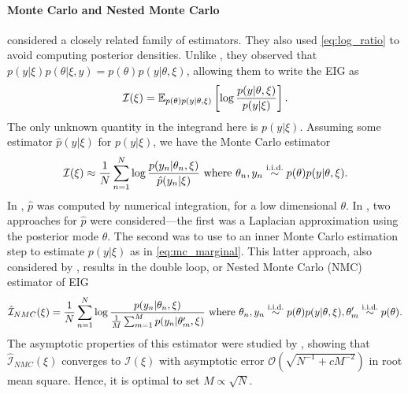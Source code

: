 \documentclass[a4paper, 10pt]{report}
\theoremstyle{plain}
\begin{document}
	\paragraph{Monte Carlo and Nested Monte Carlo} \citet{hamada2001finding,ryan2003estimating} considered a closely related family of estimators.
	They also used \eqref{eq:log_ratio} to avoid computing posterior densities.
	Unlike \citet{cook2008optimal,ryan2014towards}, they observed that $p(y|\xi)p(\theta|\xi,y) = p(\theta)p(y|\theta,\xi)$, allowing them to write the EIG as 
	\begin{equation}
	\mathcal{I}(\xi) = \mathbb{E}_{p(\theta)p(y|\theta,\xi)}\left[\log\frac{p(y|\theta,\xi)}{p(y|\xi)} \right].
	\end{equation}
	The only unknown quantity in the integrand here is $p(y|\xi)$. Assuming some estimator $\hat{p}(y|\xi)$ for $p(y|\xi)$, we have the Monte Carlo estimator
	\begin{equation}
	\mathcal{I}(\xi) \approx \frac{1}{N}\sum_{n=1}^N \log \frac{p(y_n|\theta_n,\xi)}{\hat{p}(y_n|\xi)} \text{ where } \theta_n,y_n \overset{\scriptstyle{\text{i.i.d.}}}{\sim} p(\theta)p(y|\theta,\xi).
	\end{equation}
	In \citet{hamada2001finding}, $\hat{p}$ was computed by numerical integration, for a low dimensional $\theta$.
	In \citet{ryan2003estimating}, two approaches for $\hat{p}$ were considered---the first was a Laplacian approximation using the posterior mode $\hat{\theta}$.
	The second was to use to an inner Monte Carlo estimation step to estimate $p(y|\xi)$ as in \eqref{eq:mc_marginal}.
	This latter approach, also considered by \citet{myung2013,rainforth2017thesis}, results in the double loop, or Nested Monte Carlo (NMC) estimator of EIG
	\begin{equation}
	\label{eq:nmc_estimator}
	\hat{\mathcal{I}}_{NMC}(\xi) = \frac{1}{N} \sum_{n=1}^N \log \frac{p(y_n|\theta_n,\xi)}{\frac{1}{M}\sum_{m=1}^M p(y_n|\theta'_m,\xi)} \text{ where } \theta_n,y_n \overset{\scriptstyle{\text{i.i.d.}}}{\sim} p(\theta)p(y|\theta,\xi),\theta'_m\overset{\scriptstyle{\text{i.i.d.}}}{\sim} p(\theta).
	\end{equation}
	The asymptotic properties of this estimator were studied by \citet{rainforth2018nesting,zheng2018robust,beck2018fast}, showing that $\hat{\mathcal{I}}_{NMC}(\xi)$ converges to $\mathcal{I}(\xi)$ with asymptotic error $\mathcal{O}\left(\sqrt{N^{-1} + cM^{-2}}\right)$ in root mean square. Hence, it is optimal to set $M \propto \sqrt{N}$.
	
	
\end{document}
